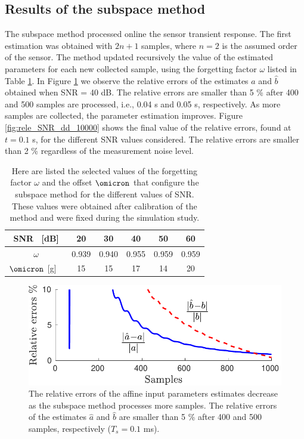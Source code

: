 \subsection{Results of the subspace method}

The subspace method processed online the sensor transient response.
The first estimation was obtained with $2n+1$ samples, where $n=2$ is the assumed order of the sensor.
The method updated recursively the value of the estimated parameters for each new collected sample, using the forgetting factor $\omega$ listed in Table \ref{table:lambdas}.
In Figure \ref{fig:rele_dd_40dB_s1} we observe the relative errors of the estimates $\widehat{a}$ and $\widehat{b}$ obtained when SNR = 40 dB. 
The relative errors are smaller than 5 \% after 400 and 500 samples are processed, i.e., 0.04 s and 0.05 s, respectively.
As more samples are collected, the parameter estimation improves.
Figure \ref{fig:rele_SNR_dd_10000} shows the final value of the relative errors, found at $t=0.1$ s, for the different SNR values considered.
The relative errors are smaller than 2 \% regardless of the measurement noise level.

\begin{table}[h!]
\centering
\caption{Here are listed the selected values of the forgetting factor $\omega$ and the offset $\omicron$ that configure the subspace method for the different values of SNR. These values were obtained after calibration of the method and were fixed during the simulation study.}
\begin{tabular}{c| c c c c c} 
 \hline
 SNR \ [dB] & 20 & 30 & 40 & 50 & 60 \\ [0.5ex] 
 \hline
 $\omega$ & 0.939 & 0.940 & 0.955 & 0.959 & 0.959 \\ %
 $\omicron$ [g] \  & 15 & 15 & 17 & 14 & 20 \\ [0.5ex] %
 \hline
\end{tabular}
\label{table:lambdas}
\end{table}


\begin{figure}[!htbp]
\centering
\includegraphics[width=0.69\columnwidth]{./ChapterRampInput/fig/Fig_3.pdf} 
\caption{ \label{fig:rele_dd_40dB_s1} The relative errors of the affine input parameters estimates decrease as the subspace method processes more samples. The relative errors of the estimates $\widehat{a}$ and $\widehat{b}$ are smaller than 5 \% after 400 and 500 samples, respectively ($T_s = 0.1$ ms). }
\end{figure}


